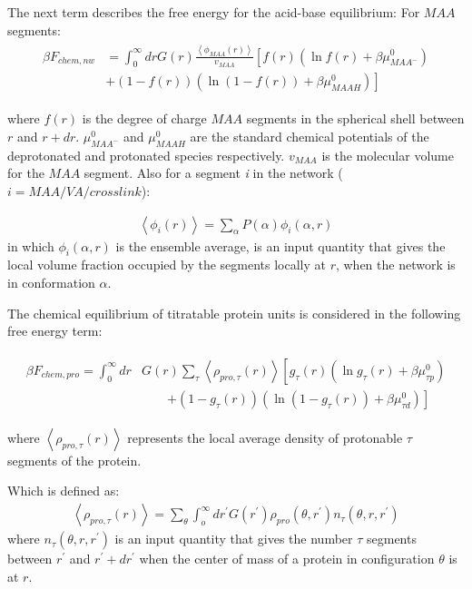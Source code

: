 The next term describes the free energy for the acid-base equilibrium:
For $MAA$ segments:
\begin{align}
	\begin{aligned}
		\beta F_{chem,nw} &= \int_0^\infty drG(r) \frac{\left<\phi_{MAA}(r)\right>}{v_{MAA}} \left[f(r)(\ln f(r)+ \beta\mu^0_{MAA^-})\right.\\
		&\left.+(1-f(r))(\ln (1-f(r))+\beta\mu^0_{MAAH})\right]    
	\end{aligned}
\end{align} 


\noindent where $f(r)$ is the degree of charge $MAA$ segments in the spherical shell between $r$ and $r + dr$. 
$\mu^0_{MAA^-}$ and $\mu^0_{MAAH}$ are the standard chemical potentials of the deprotonated and protonated species respectively. $v_{MAA}$ is the molecular volume for the $MAA$ segment.
Also for a segment \textit{i} in the network ($i = MAA/VA/crosslink$): 

\begin{align}
	\left< \phi_i(r)\right> = \sum_\alpha{P(\alpha)\phi_i(\alpha,r)}
\end{align}
\noindent in which $\phi_i(\alpha,r)$ is the ensemble average, is an input quantity that gives the local volume fraction occupied by the segments locally at $r$, when the network is in conformation $\alpha$.


The chemical equilibrium of titratable protein units is considered in the following free energy term:

\begin{align}
	\begin{aligned}
		\beta F_{chem,pro} =\int_0^\infty dr &G(r) \sum_\tau \left<\rho_{pro,\tau}(r)\right> \left[g_\tau(r)(\ln g_\tau(r)+ \beta\mu^0_{\tau p})\right.\\
		&\qquad\left.+(1-g_\tau(r))(\ln (1-g_\tau(r))+\beta\mu^0_{\tau d})\right]   
	\end{aligned}
\end{align} 

\noindent where $\left<\rho_{pro,\tau}(r)\right>$ represents the local average density of protonable $\tau$ segments of the protein.

Which is defined as:
\begin{align}
	\left<\rho_{pro,\tau}(r)\right> = \sum_\theta \int_o^\infty dr^\prime G(r^\prime) \rho_{pro}(\theta,r^\prime)n_\tau(\theta,r,r^\prime)
	\label{eq:segments-pro-si}
\end{align}
\noindent where $n_\tau(\theta,r,r^\prime)$ is an input quantity that gives the number $\tau$ segments  between $r^\prime$ and $r^\prime+ dr^\prime$ when the center of mass of a protein in configuration $\theta$ is at $r$.

